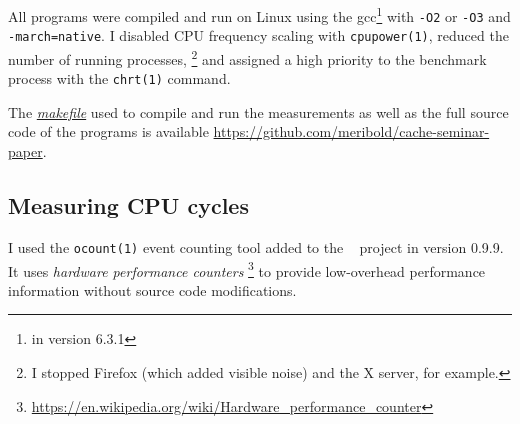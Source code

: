 \begin{comment}
General mitigation/alleviation strategy: take the minimum execution time of \alts{all, a
number of} runs; all noise is additive (TODO: not the one caused by the cache being hot).
\end{comment}

All programs were compiled and run on Linux using the \gls{gcc}\footnote{%
   in version 6.3.1
}
with \texttt{-O2} or \texttt{-O3} and
\texttt{-march=native}.
I disabled CPU frequency scaling with \texttt{cpupower(1)},
reduced the number of running processes,%
\footnote{%
   I stopped Firefox (which added visible noise) and the X server, for example.
}
and assigned a high priority to the benchmark process with the \texttt{chrt(1)}
command.

The \emph{\href{https://github.com/meribold/cache-seminar-paper/blob/master/makefile}
{makefile}} used to compile and run the measurements as well as the full source code of
the programs is available 
\url{https://github.com/meribold/cache-seminar-paper}.

\subsection{Measuring CPU cycles}
\label{app:cycles}





I used the \texttt{ocount(1)} event counting tool added to the
~\cite{oprofile} project in version 0.9.9.
%
It uses \emph{hardware performance counters}%
\footnote{%
   \url{https://en.wikipedia.org/wiki/Hardware_performance_counter}
}
to provide low-overhead performance information without source code modifications.

